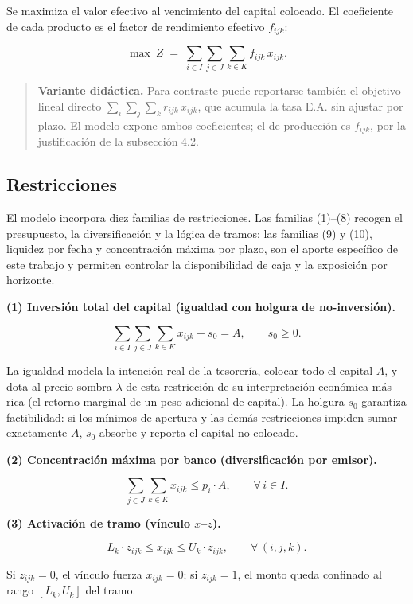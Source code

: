 \documentclass[11pt,a4paper]{article}
\begin{document}
Se maximiza el valor efectivo al vencimiento del capital colocado. El coeficiente de cada producto es el factor de rendimiento efectivo $f_{ijk}$:

\[
\max\ Z \;=\; \sum_{i \in I} \sum_{j \in J} \sum_{k \in K} f_{ijk}\, x_{ijk} .
\]

\begin{quote}
\textbf{Variante didáctica.} Para contraste puede reportarse también el objetivo lineal directo $\sum_{i}\sum_{j}\sum_{k} r_{ijk}\, x_{ijk}$, que acumula la tasa E.A. sin ajustar por plazo. El modelo expone ambos coeficientes; el de producción es $f_{ijk}$, por la justificación de la subsección 4.2.
\end{quote}

\subsection{Restricciones}

El modelo incorpora diez familias de restricciones. Las familias (1)--(8) recogen el presupuesto, la diversificación y la lógica de tramos; las familias (9) y (10), liquidez por fecha y concentración máxima por plazo, son el aporte específico de este trabajo y permiten controlar la disponibilidad de caja y la exposición por horizonte.

\textbf{(1) Inversión total del capital (igualdad con holgura de no-inversión).}

\[
\sum_{i \in I} \sum_{j \in J} \sum_{k \in K} x_{ijk} + s_0 = A, \qquad s_0 \ge 0 .
\]

La igualdad modela la intención real de la tesorería, colocar todo el capital $A$, y dota al precio sombra $\lambda$ de esta restricción de su interpretación económica más rica (el retorno marginal de un peso adicional de capital). La holgura $s_0$ garantiza factibilidad: si los mínimos de apertura y las demás restricciones impiden sumar exactamente $A$, $s_0$ absorbe y reporta el capital no colocado.

\textbf{(2) Concentración máxima por banco (diversificación por emisor).}

\[
\sum_{j \in J} \sum_{k \in K} x_{ijk} \le p_i \cdot A, \qquad \forall\, i \in I .
\]

\textbf{(3) Activación de tramo (vínculo $x$--$z$).}

\[
L_k \cdot z_{ijk} \le x_{ijk} \le U_k \cdot z_{ijk}, \qquad \forall\, (i, j, k) .
\]

Si $z_{ijk} = 0$, el vínculo fuerza $x_{ijk} = 0$; si $z_{ijk} = 1$, el monto queda confinado al rango $[L_k, U_k]$ del tramo.
\end{document}
